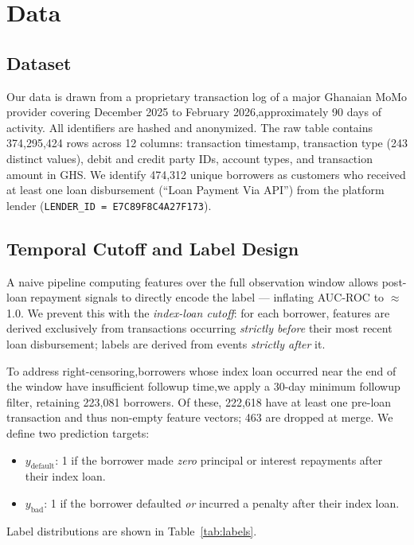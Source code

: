 \documentclass{article}
\begin{document}
\section{Data}

\subsection{Dataset}

Our data is drawn from a proprietary transaction log of a major Ghanaian
MoMo provider covering December 2025 to February 2026,approximately
90 days of activity.
All identifiers are hashed and anonymized.
The raw table contains 374,295,424 rows across 12 columns:
transaction timestamp, transaction type (243 distinct values), debit
and credit party IDs, account types, and transaction amount in GHS.
We identify 474,312 unique borrowers as customers who received at least
one loan disbursement (``Loan Payment Via API'') from the platform
lender (\texttt{LENDER\_ID = E7C89F8C4A27F173}).

\subsection{Temporal Cutoff and Label Design}

A naive pipeline computing features over the full observation window
allows post-loan repayment signals to directly encode the label —
inflating AUC-ROC to $\approx$1.0.
We prevent this with the \emph{index-loan cutoff}: for each borrower,
features are derived exclusively from transactions occurring
\emph{strictly before} their most recent loan disbursement; labels are
derived from events \emph{strictly after} it.

To address right-censoring,borrowers whose index loan occurred near
the end of the window have insufficient followup time,we apply a
30-day minimum followup filter, retaining 223,081 borrowers.
Of these, 222,618 have at least one pre-loan transaction and thus
non-empty feature vectors; 463 are dropped at merge.
We define two prediction targets:
\begin{itemize}
  \item $y_{\text{default}}$: 1 if the borrower made \emph{zero}
        principal or interest repayments after their index loan.
  \item $y_{\text{bad}}$: 1 if the borrower defaulted \emph{or}
        incurred a penalty after their index loan.
\end{itemize}

Label distributions are shown in Table~\ref{tab:labels}.
\end{document}
